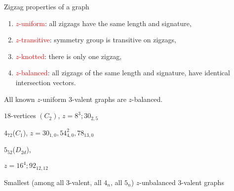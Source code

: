 \documentclass[%
pdf,
colorBG,
slideColor,
]{prosper}
\begin{document}
\begin{slide}{Zigzag properties of a graph}
{\scriptsize
\begin{enumerate}
\item[\ding{108}] \textcolor{red}{$z$-uniform}: all zigzags have the same length and signature, 
\item[\ding{108}] \textcolor{red}{$z$-transitive}: symmetry group is transitive on zigzags,
\item[\ding{108}] \textcolor{red}{$z$-knotted}: there is only one zigzag,
\item[\ding{108}] \textcolor{red}{$z$-balanced}: all zigzags of the same length and signature, have identical intersection vectors.
\end{enumerate}
}
All known $z$-uniform $3$-valent graphs are $z$-balanced.

\begin{center}
\begin{minipage}[b]{3.7cm}
\centering
{}\par
{\tiny $18$-vertices $(C_2)$, $z=8^3; 30_{2,5}$}
\end{minipage}
\begin{minipage}[b]{3.7cm}
\centering
{}\par
{\tiny $4_{72}$($C_1$), $z=30_{1,0}, 54^2_{4,0}, 78_{13, 0}$}
\end{minipage}
\begin{minipage}[b]{3.7cm}
\centering
{}\par
{\tiny $5_{52}$($D_{2d}$),\par
 $z=16^4; 92_{12, 12}$}
\end{minipage}
\end{center}
\vspace{-2mm}
\begin{center}
{\tiny Smallest (among all $3$-valent, all $4_n$, all $5_n$) $z$-unbalanced $3$-valent graphs}
\end{center}

\end{slide}
\end{document}
